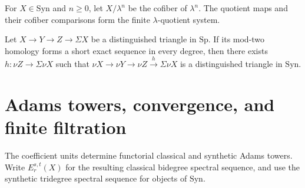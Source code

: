\begin{definition}
\label{sem:AdamsSynthetic:lambda-quotients}
For $X\in\mathrm{Syn}$ and $n\geq0$, let $X/\lambda^n$ be the cofiber of $\lambda^n$. The quotient maps and their cofiber comparisons form the finite $\lambda$-quotient system.
\end{definition}

\begin{theorem}
\label{sem:AdamsSynthetic:nu-exactness}
Let $X\to Y\to Z\to\Sigma X$ be a distinguished triangle in $\mathrm{Sp}$. If its mod-two homology forms a short exact sequence in every degree, then there exists $h\colon\nu Z\to\Sigma\nu X$ such that $\nu X\to\nu Y\to\nu Z\xrightarrow{h}\Sigma\nu X$ is a distinguished triangle in $\mathrm{Syn}$.
\end{theorem}

\section{Adams towers, convergence, and finite filtration}

\begin{definition}
\label{sem:AdamsSynthetic:families}
The coefficient units determine functorial classical and synthetic Adams towers. Write $E_r^{s,t}(X)$ for the resulting classical bidegree spectral sequence, and use the synthetic tridegree spectral sequence for objects of $\mathrm{Syn}$.
\end{definition}

